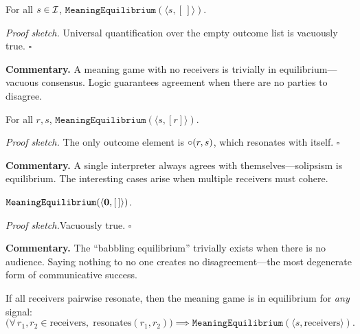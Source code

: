 \begin{theorem}
\label{thm:empty_game_equilibrium}
For all $s \in \mathcal{I}$, $\texttt{MeaningEquilibrium}(\langle s, [\,] \rangle)$.
\end{theorem}

\noindent\textit{Proof sketch.}\quad
Universal quantification over the empty outcome list is vacuously true.
\hfill$\square$

\medskip

\noindent\textbf{Commentary.}
A meaning game with no receivers is trivially in equilibrium---vacuous
consensus.  Logic guarantees agreement when there are no parties to
disagree.

\begin{theorem}
\label{thm:singleton_equilibrium}
For all $r, s$, $\texttt{MeaningEquilibrium}(\langle s, [r] \rangle)$.
\end{theorem}

\noindent\textit{Proof sketch.}\quad
The only outcome element is $\circ(r, s)$, which resonates with itself.
\hfill$\square$

\medskip

\noindent\textbf{Commentary.}
A single interpreter always agrees with themselves---solipsism is
equilibrium.  The interesting cases arise when multiple receivers must
cohere.

\begin{theorem}
\label{thm:trivial_equilibrium_exists}
$\texttt{MeaningEquilibrium}(\langle \mathbf{0}, [\,] \rangle)$.
\end{theorem}

\noindent\textit{Proof sketch.}\quad Vacuously true. \hfill$\square$

\medskip

\noindent\textbf{Commentary.}
The ``babbling equilibrium'' trivially exists when there is no audience.
Saying nothing to no one creates no disagreement---the most degenerate
form of communicative success.

\begin{theorem}
\label{thm:resonant_community_equilibrium}
If all receivers pairwise resonate, then the meaning game is in equilibrium
for \emph{any} signal:
\[
  \bigl(\forall\, r_1, r_2 \in \text{receivers},\;
  \text{resonates}(r_1, r_2)\bigr)
  \implies
  \texttt{MeaningEquilibrium}(\langle s, \text{receivers} \rangle).
\]
\end{theorem}

